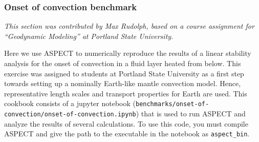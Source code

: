 \documentclass{article}
\newcommand{\aspect}{\textsc{ASPECT}}
\begin{document}
\subsubsection{Onset of convection benchmark}
\label{sec:benchmark-onset-of-convection}
\textit{This section was contributed by Max Rudolph, based on a course assignment for ``Geodynamic Modeling'' at Portland State University.}

Here we use \aspect{} to numerically reproduce the results of a linear stability analysis for the onset of convection in a fluid layer heated from below. This exercise was assigned to students at Portland State University as a first step towards setting up a nominally Earth-like mantle convection model. Hence, representative length scales and transport properties for Earth are used. This cookbook consists of a jupyter notebook (\texttt{benchmarks/onset-of-convection/onset-of-convection.ipynb}) that is used to run \aspect{} and analyze the results of several calculations. To use this code, you must compile \aspect{} and give the path to the executable in the notebook as \texttt{aspect\_bin}.
\end{document}
